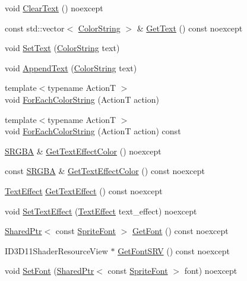 \begin{DoxyCompactItemize}
\item 
void \hyperlink{classmage_1_1_sprite_text_add6f3e1150dc041d999dba772e43be14}{Clear\+Text} () noexcept
\item 
const std\+::vector$<$ \hyperlink{classmage_1_1_color_string}{Color\+String} $>$ \& \hyperlink{classmage_1_1_sprite_text_a035a18c8c388649f38a6a62e3cbcc18a}{Get\+Text} () const noexcept
\item 
void \hyperlink{classmage_1_1_sprite_text_a6853a914502bb28cfc4dc14160345542}{Set\+Text} (\hyperlink{classmage_1_1_color_string}{Color\+String} text)
\item 
void \hyperlink{classmage_1_1_sprite_text_ae401ba9ddbb1e53e84fb24f4bd4f11bb}{Append\+Text} (\hyperlink{classmage_1_1_color_string}{Color\+String} text)
\item 
{\footnotesize template$<$typename ActionT $>$ }\\void \hyperlink{classmage_1_1_sprite_text_ad975957b908ad3926ace75fb60ff4474}{For\+Each\+Color\+String} (ActionT action)
\item 
{\footnotesize template$<$typename ActionT $>$ }\\void \hyperlink{classmage_1_1_sprite_text_abc70368fd800a82cbd1ec31f51d4db17}{For\+Each\+Color\+String} (ActionT action) const
\item 
\hyperlink{structmage_1_1_s_r_g_b_a}{S\+R\+G\+BA} \& \hyperlink{classmage_1_1_sprite_text_a0b8d0df75efa9dd9e666b68db6ee71b5}{Get\+Text\+Effect\+Color} () noexcept
\item 
const \hyperlink{structmage_1_1_s_r_g_b_a}{S\+R\+G\+BA} \& \hyperlink{classmage_1_1_sprite_text_af9f15b5b215e1433cee2152a5ce5e299}{Get\+Text\+Effect\+Color} () const noexcept
\item 
\hyperlink{classmage_1_1_sprite_text_a4d3101d037b6fe4247d77b5fbf811dd2}{Text\+Effect} \hyperlink{classmage_1_1_sprite_text_a1f5b83df9a7332ac3774a038df169847}{Get\+Text\+Effect} () const noexcept
\item 
void \hyperlink{classmage_1_1_sprite_text_ae258a31796c3fa6b8c31e0b98010a0ef}{Set\+Text\+Effect} (\hyperlink{classmage_1_1_sprite_text_a4d3101d037b6fe4247d77b5fbf811dd2}{Text\+Effect} text\+\_\+effect) noexcept
\item 
\hyperlink{namespacemage_a1e01ae66713838a7a67d30e44c67703e}{Shared\+Ptr}$<$ const \hyperlink{classmage_1_1_sprite_font}{Sprite\+Font} $>$ \hyperlink{classmage_1_1_sprite_text_aa1aab1690f37220babce2639463bd7d5}{Get\+Font} () const noexcept
\item 
I\+D3\+D11\+Shader\+Resource\+View $\ast$ \hyperlink{classmage_1_1_sprite_text_a2e09c7c64f9ef7bcc5a28ccfb4f13040}{Get\+Font\+S\+RV} () const noexcept
\item 
void \hyperlink{classmage_1_1_sprite_text_a46235c90d3fc9872c2342cd17eaa9e89}{Set\+Font} (\hyperlink{namespacemage_a1e01ae66713838a7a67d30e44c67703e}{Shared\+Ptr}$<$ const \hyperlink{classmage_1_1_sprite_font}{Sprite\+Font} $>$ font) noexcept
\end{DoxyCompactItemize}
